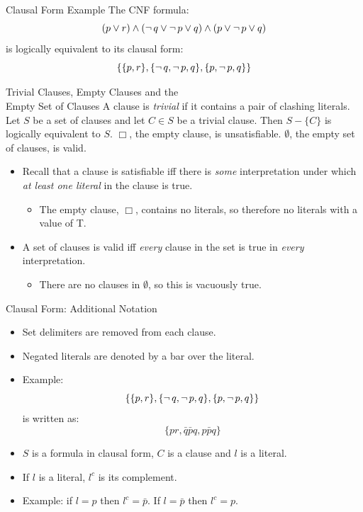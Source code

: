 \documentclass[style=sailor,size=12pt]{powerdot}
\theoremstyle{definition}
\newenvironment{defn}[1]
  {\renewcommand\theinnerdefn{#1}\innerdefn}
  {\endinnerdefn}
\newenvironment{ex}[1]
  {\renewcommand\theinnerexample{#1}\innerexample}
  {\endinnerexample}
\newenvironment{lem}[1]
  {\renewcommand\theinnerlem{#1}\innerlem}
  {\endinnerlem}
\begin{document}
\begin{wideslide}[bm=,toc=]{Clausal Form Example}
\begin{ex}{4.7}
The CNF formula:
\[ (p \lor r)\land (\mathop{\neg} q \lor \mathop{\neg} p \lor q) \land (p \lor \mathop{\neg} p \lor q) \] is
logically equivalent to its clausal form:
\[ \{\{p,r\},\{\mathop{\neg} q, \mathop{\neg} p, q\},\{p, \mathop{\neg} p, q\} \} \]
\end{ex}
\end{wideslide}

\begin{wideslide}[bm=,toc=]{Trivial Clauses, Empty Clauses and the\\ Empty Set of
  Clauses}
\begin{defn}{4.8}
A clause is \emph{trivial} if it contains a pair of clashing literals.
\end{defn}
\begin{lem}{4.9}
Let $S$ be a set of clauses and let $C \in S$ be a trivial clause. Then $S -
\{C\}$ is logically equivalent to $S$.
\end{lem}
\begin{lem}{4.10}
$\Box$, the empty clause, is unsatisfiable. $\emptyset$, the empty set of
clauses, is valid.
\end{lem}
\begin{itemize}
\item Recall that a clause is satisfiable iff there is \emph{some} interpretation
under which \emph{at least one literal} in the clause is true.
\begin{itemize}
\item The empty clause, $\Box$, contains no literals, so therefore no literals with a value of T.
\end{itemize}
\item A set of clauses is valid iff \emph{every} clause in the set is true in
\emph{every} interpretation.
\begin{itemize}
\item There are no clauses in $\emptyset$, so this is vacuously true.
\end{itemize}
\end{itemize}

\end{wideslide}

\begin{wideslide}[bm=,toc=]{Clausal Form: Additional Notation}
\begin{itemize}
\item Set delimiters are removed from each clause.
\item Negated literals are denoted by a bar over the literal.
\item Example: \[ \{\{p,r\},\{\mathop{\neg} q, \mathop{\neg} p, q\},\{p, \mathop{\neg} p, q\} \} \] is
written as:
\[\{pr, \bar{q}\bar{p}q, p\bar{p}q \}  \]
\item $S$ is a formula in clausal form, $C$ is a clause and $l$ is a literal.
\item If $l$ is a literal, $l^c$ is its complement.
\item Example: if $l = p$ then $l^c = \bar{p}$. If $l = \bar{p}$ then $l^c = p$.
\end{itemize}
\end{wideslide}
\end{document}
